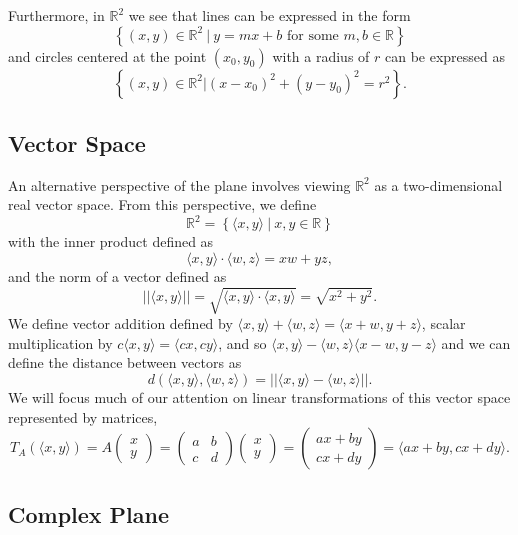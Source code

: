 \documentclass[
]{book}
\theoremstyle{definition}
\theoremstyle{definition}
\theoremstyle{definition}
\theoremstyle{definition}
\theoremstyle{remark}
\begin{document}
Furthermore, in \(\mathbb{R}^2\) we see that lines can be expressed in the form \[\left\{ (x,y) \in \mathbb{R}^2 \: \vert \: y=mx+b \mbox{ for some } m,b\in \mathbb{R}\right\}\] and circles centered at the point \((x_0,y_0)\) with a radius of \(r\) can be expressed as \[\left\{ (x,y)\in \mathbb{R}^2 \vert (x-x_0)^2 + (y-y_0)^2 = r^2\right\}.\]

\hypertarget{vector-space}{%
\subsection{Vector Space}\label{vector-space}}

An alternative perspective of the plane involves viewing \(\mathbb{R}^2\) as a two-dimensional real vector space. From this perspective, we define
\[\mathbb{R}^2 = \left\{ \langle x,y\rangle  \: \vert \: x,y\in \mathbb{R}\right\}\] with the inner product defined as \[\langle x,y\rangle\cdot \langle w,z\rangle = xw+yz,\] and the norm of a vector defined as \[||\langle x,y\rangle ||=\sqrt{\langle x,y\rangle \cdot\langle x,y\rangle }=\sqrt{x^2+y^2}.\] We define vector addition defined by \(\langle x,y\rangle +\langle w,z\rangle = \langle x+w, y+z\rangle\), scalar multiplication by \(c \langle x,y\rangle =\langle cx,cy\rangle\), and so \(\langle x,y\rangle -\langle w,z\rangle \langle x-w,y-z\rangle\) and we can define the distance between vectors as
\[d\left( \langle x,y\rangle ,\langle w,z\rangle \right) = || \langle x,y\rangle -\langle w,z\rangle ||.\] We will focus much of our attention on linear transformations of this vector space represented by matrices,
\[T_A\left(\langle x,y\rangle \right) = A\begin{pmatrix} x \\ y \end{pmatrix} = \begin{pmatrix} a & b \\ c & d \end{pmatrix} \begin{pmatrix} x \\ y \end{pmatrix} = \begin{pmatrix} ax+by \\ cx+dy \end{pmatrix} = \langle ax+by, cx+dy\rangle .\]

\hypertarget{complex-plane}{%
\subsection{Complex Plane}\label{complex-plane}}
\end{document}
